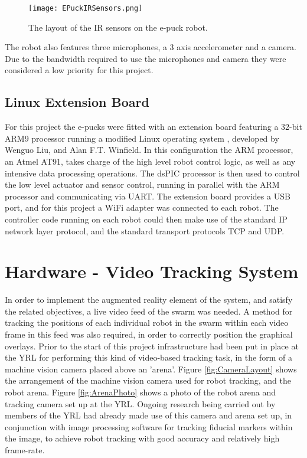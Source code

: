 \begin{figure}
	\begin{center}
	\texttt{[image: EPuckIRSensors.png]}
	\decoRule
	\caption[e-puck IR Sensor Layout]{The layout of the IR sensors on the e-puck robot.}
	\label{fig:EPuckIRSensors}
	\end{center}
\end{figure}

The robot also features three microphones, a 3 axis accelerometer and a camera. Due to the bandwidth required to use the microphones and camera they were considered a low priority for this project.


\subsection{Linux Extension Board} \label{LinuxExtensionBoard}
For this project the e-pucks were fitted with an extension board featuring a 32-bit ARM9 processor running a modified Linux operating system \cite{LinuxExtensionBoard}, developed by Wenguo Liu, and Alan F.T. Winfield. In this configuration the ARM processor, an Atmel AT91, takes charge of the high level robot control logic, as well as any intensive data processing operations. The dsPIC processor is then used to control the low level actuator and sensor control, running in parallel with the ARM processor and communicating via UART. The extension board provides a USB port, and for this project a WiFi adapter was connected to each robot. The controller code running on each robot could then make use of the standard IP network layer protocol, and the standard transport protocols TCP and UDP.



\section{Hardware - Video Tracking System} \label{TrackingHardware}

In order to implement the augmented reality element of the system, and satisfy the related objectives, a live video feed of the swarm was needed. A method for tracking the positions of each individual robot in the swarm within each video frame in this feed was also required, in order to correctly position the graphical overlays. Prior to the start of this project infrastructure had been put in place at the YRL for performing this kind of video-based tracking task, in the form of a machine vision camera placed above an 'arena'. Figure \ref{fig:CameraLayout} shows the arrangement of the machine vision camera used for robot tracking, and the robot arena. Figure \ref{fig:ArenaPhoto} shows a photo of the robot arena and tracking camera set up at the YRL. Ongoing research being carried out by members of the YRL had already made use of this camera and arena set up, in conjunction with image processing software for tracking fiducial markers within the image, to achieve robot tracking with good accuracy and relatively high frame-rate.

